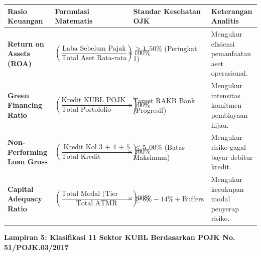 \documentclass[12pt,a4paper]{article}
\numberwithin{equation}{section}
\begin{document}
\vspace{0.3cm}
\begin{table}[H]
  \small
  \begin{tabularx}{\textwidth}{|>{\raggedright\arraybackslash}p{2.6cm}|>{\centering\arraybackslash}p{4.2cm}|>{\centering\arraybackslash}p{2.2cm}|>{\raggedright\arraybackslash}X|}
    \hline
    \textbf{Rasio Keuangan} & \textbf{Formulasi Matematis} & \textbf{Standar Kesehatan OJK} & \textbf{Keterangan Analitis} \\
    \hline
    \textbf{Return on Assets (ROA)} & $\left(\dfrac{\text{Laba Sebelum Pajak}}{\text{Total Aset Rata-rata}}\right) \times 100\%$ & $\ge 1{,}50\%$ (Peringkat 1) & Mengukur efisiensi pemanfaatan aset operasional. \\
    \hline
    \textbf{Green Financing Ratio} & $\left(\dfrac{\text{Kredit KUBL POJK 51}}{\text{Total Portofolio Kredit}}\right) \times 100\%$ & Target RAKB Bank (Progresif) & Mengukur intensitas komitmen pembiayaan hijau. \\
    \hline
    \textbf{Non-Performing Loan Gross} & $\left(\dfrac{\text{Kredit Kol 3 + 4 + 5}}{\text{Total Kredit Disalurkan}}\right) \times 100\%$ & $\le 5{,}00\%$ (Batas Maksimum) & Mengukur risiko gagal bayar debitur kredit. \\
    \hline
    \textbf{Capital Adequacy Ratio} & $\left(\dfrac{\text{Total Modal (Tier 1+2)}}{\text{Total ATMR}}\right) \times 100\%$ & $\ge 8\% - 14\% + \text{Buffers}$ & Mengukur kecukupan modal penyerap risiko. \\
    \hline
  \end{tabularx}
\end{table}

\vspace{0.8cm}
\noindent \textbf{Lampiran 5: Klasifikasi 11 Sektor KUBL Berdasarkan POJK No. 51/POJK.03/2017}
\end{document}
